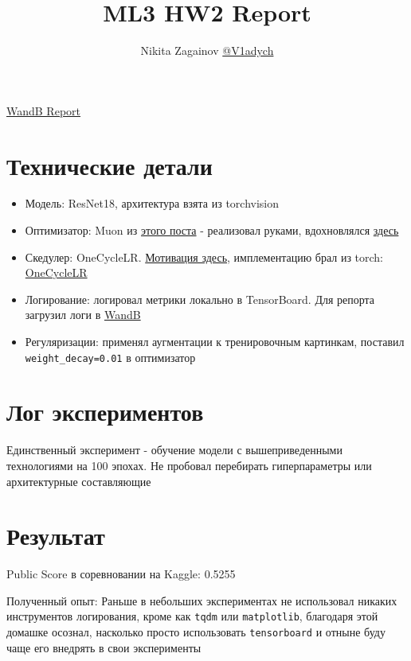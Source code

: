 \documentclass{article}
\begin{document}
\title{ML3 HW2 Report}
\date{}
\author{Nikita Zagainov \href{https://t.me/V1adych}{@V1adych}}
\maketitle

\href{https://api.wandb.ai/links/v1adych-team/ogmbjgg0}{WandB Report}

\section*{Технические детали}
\begin{itemize}
    \item Модель: ResNet18, архитектура взята из torchvision
    \item Оптимизатор: Muon из \href{https://kellerjordan.github.io/posts/muon/}{этого поста} - реализовал руками, вдохновлялся \href{https://github.com/nil0x9/flash-muon/blob/main/flash_muon/muon.py}{здесь}
    \item Скедулер: OneCycleLR. \href{https://arxiv.org/pdf/1708.07120}{Мотивация здесь}, имплементацию брал из torch: \href{https://docs.pytorch.org/docs/stable/generated/torch.optim.lr_scheduler.OneCycleLR.html}{OneCycleLR}
    \item Логирование: логировал метрики локально в TensorBoard. Для репорта загрузил логи в \href{https://api.wandb.ai/links/v1adych-team/ogmbjgg0}{WandB}
    \item Регуляризации: применял аугментации к тренировочным картинкам, поставил \texttt{weight\_decay=0.01} в оптимизатор 
\end{itemize}

\section*{Лог экспериментов}
Единственный эксперимент - обучение модели с вышеприведенными технологиями на 100 эпохах. Не пробовал перебирать гиперпараметры или архитектурные составляющие

\section*{Результат}
Public Score в соревновании на Kaggle: 0.5255

Полученный опыт: Раньше в небольших экспериментах не использовал никаких инструментов логирования, кроме как \texttt{tqdm} или \texttt{matplotlib}, благодаря этой домашке осознал, насколько просто использовать \texttt{tensorboard} и отныне буду чаще его внедрять в свои эксперименты
\end{document}
